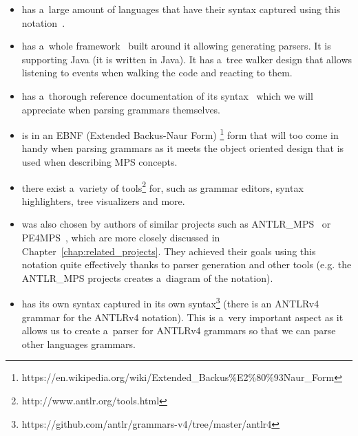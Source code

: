 \begin{itemize}
	\item has a~large amount of languages that have their syntax captured using this notation~\cite{ANTLR4grammars}.

	\item has a~whole framework~\cite{ANTLR4} built around it allowing generating parsers.
	It is supporting Java (it is written in Java).
	It has a~tree walker design that allows listening to events when walking the code and reacting to them.

	\item has a~thorough reference documentation of its syntax~\cite{ANTLR4reference} which we will appreciate when parsing grammars themselves.

	\item is in an EBNF (Extended Backus-Naur Form) \footnote{https://en.wikipedia.org/wiki/Extended{\_}Backus\%E2\%80\%93Naur{\_}Form} form that will too come in handy when parsing grammars as it meets the object oriented design that is used when describing MPS concepts.

	\item there exist a~variety of tools\footnote{http://www.antlr.org/tools.html} for, such as grammar editors, syntax highlighters, tree visualizers and more.

	\item was also chosen by authors of similar projects such as ANTLR{\_}MPS~\cite{ANTLR2MPS} or PE4MPS~\cite{PE4MPS}, which are more closely discussed in Chapter~\ref{chap:related_projects}.
	They achieved their goals using this notation quite effectively thanks to parser generation and other tools (e.g. the ANTLR{\_}MPS projects creates a~diagram of the notation).

	\item has its own syntax captured in its own syntax\footnote{https://github.com/antlr/grammars-v4/tree/master/antlr4} (there is an ANTLRv4 grammar for the ANTLRv4 notation).
	This is a~very important aspect as it allows us to create a~parser for ANTLRv4 grammars so that we can parse other languages grammars.
\end{itemize}
